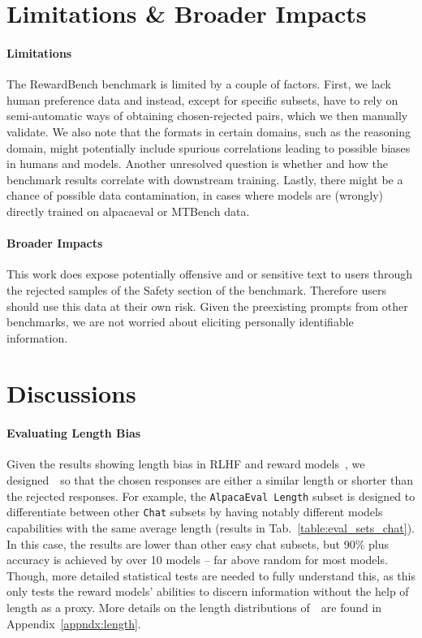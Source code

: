 \section{Limitations \& Broader Impacts}
\label{sec:limitation_impact}

\paragraph{Limitations}
The RewardBench benchmark is limited by a couple of factors. First, we lack human preference data and instead, except for specific subsets, have to rely on semi-automatic ways of obtaining chosen-rejected pairs, which we then manually validate. We also note that the formats in certain domains, such as the reasoning domain, might potentially include spurious correlations leading to possible biases in humans and models.
Another unresolved question is whether and how the benchmark results correlate with downstream training. Lastly, there might be a chance of possible data contamination, in cases where models are (wrongly) directly trained on alpacaeval or MTBench data.


\paragraph{Broader Impacts}
This work does expose potentially offensive and or sensitive text to users through the rejected samples of the Safety section of the benchmark.
Therefore users should use this data at their own risk.
Given the preexisting prompts from other benchmarks, we are not worried about eliciting personally identifiable information. 

\section{Discussions}
\label{sec:discussion}

\paragraph{Evaluating Length Bias} Given the results showing length bias in RLHF and reward models~\citep{singhal2023long}, we designed~\name~so that the chosen responses are either a similar length or shorter than the rejected responses.
For example, the \texttt{AlpacaEval Length} subset is designed to differentiate between other \texttt{Chat} subsets by having notably different models capabilities with the same average length (results in Tab.~\ref{table:eval_sets_chat}).
In this case, the results are lower than other easy chat subsets, but 90\% plus accuracy is achieved by over 10 models -- far above random for most models.
Though, more detailed statistical tests are needed to fully understand this, as this only tests the reward models' abilities to discern information without the help of length as a proxy. 
More details on the length distributions of~\name~are found in Appendix~\ref{appndx:length}.


